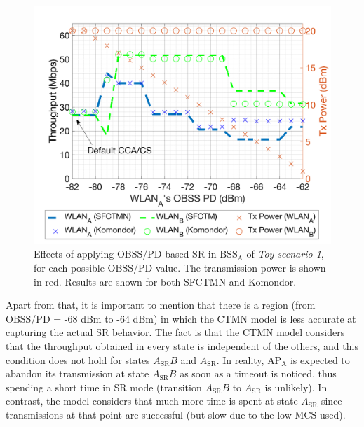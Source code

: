 \documentclass{ieeeaccess}
\begin{document}
\begin{figure}[ht!]
	\centering
	\includegraphics[width=\columnwidth]{SIM_1_1}
	\caption{Effects of applying OBSS/PD-based SR in $\text{BSS}_\text{A}$ of \emph{Toy scenario 1}, for each possible OBSS/PD value. The transmission power is shown in red. Results are shown for both SFCTMN and Komondor.}		\label{fig:toy_scenario_1_results}
\end{figure}

Apart from that, it is important to mention that there is a region (from OBSS/PD = -68 dBm to -64 dBm) in which the CTMN model is less accurate at capturing the actual SR behavior. The fact is that the CTMN model considers that the throughput obtained in every state is independent of the others, and this condition does not hold for states $A_\text{SR}B$ and $A_\text{SR}$. In reality, $\text{AP}_\text{A}$ is expected to abandon its transmission at state $A_\text{SR}B$ as soon as a timeout is noticed, thus spending a short time in SR mode (transition $A_\text{SR}B$ to $A_\text{SR}$ is unlikely). In contrast, the model considers that much more time is spent at state $A_\text{SR}$ since transmissions at that point are successful (but slow due to the low MCS used).
\end{document}
